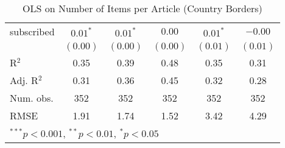 \begin{table}[!h]
\begin{center}
\begin{tabular}{l c c c c c }
subscribed              & $0.01^{*}$   & $0.01^{*}$   & $0.00$       & $0.01^{*}$   & $-0.00$      \\
                        & $(0.00)$     & $(0.00)$     & $(0.00)$     & $(0.01)$     & $(0.01)$     \\
\midrule
R$^2$                   & 0.35         & 0.39         & 0.48         & 0.35         & 0.31         \\
Adj. R$^2$              & 0.31         & 0.36         & 0.45         & 0.32         & 0.28         \\
Num. obs.               & 352          & 352          & 352          & 352          & 352          \\
RMSE                    & 1.91         & 1.74         & 1.52         & 3.42         & 4.29         \\
\bottomrule
\multicolumn{6}{l}{\scriptsize{$^{***}p<0.001$, $^{**}p<0.01$, $^*p<0.05$}}
\end{tabular}
\caption{OLS on Number of Items per Article (Country Borders)}
\label{table:coefficients}
\end{center}
\end{table}
